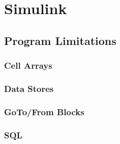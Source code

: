 \section{Simulink}
\subsection{Program Limitations}
\subsubsection{Cell Arrays}
\subsubsection{Data Stores}
\subsubsection{GoTo/From Blocks}
\subsubsection{SQL}